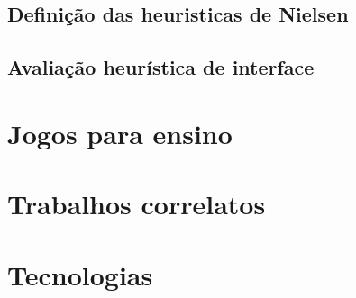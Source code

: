 \subsection{Definição das heuristicas de Nielsen}



\subsection{Avaliação heurística de interface}



\section{Jogos para ensino}



\section{Trabalhos correlatos}



\section{Tecnologias}

